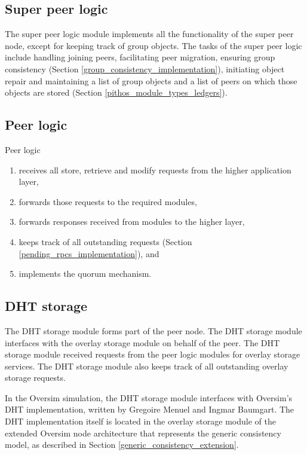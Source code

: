 \subsection{Super peer logic}
\label{pithos_module_types_sp_logic}

The super peer logic module implements all the functionality of the super peer node, except for keeping track of group objects. The tasks of the super peer logic include handling joining peers, facilitating peer migration, ensuring group consistency (Section \ref{group_consistency_implementation}), initiating object repair and maintaining a list of group objects and a list of peers on which those objects are stored (Section \ref{pithos_module_types_ledgers}).

\subsection{Peer logic}

Peer logic
\begin{enumerate}
  \item  receives all store, retrieve and modify requests from the higher application layer,
  \item forwards those requests to the required modules,
  \item forwards responses received from modules to the higher layer,
  \item keeps track of all outstanding requests (Section \ref{pending_rpcs_implementation}), and
  \item implements the quorum mechanism.
\end{enumerate}

\subsection{DHT storage}

The DHT storage module forms part of the peer node. The DHT storage module interfaces with the overlay storage module on behalf of the peer. The DHT storage module received requests from the peer logic modules for overlay storage services. The DHT storage module also keeps track of all outstanding overlay storage requests.

In the Oversim simulation, the DHT storage module interfaces with Oversim's DHT implementation, written by Gregoire Menuel and Ingmar Baumgart. The DHT implementation itself is located in the overlay storage module of the extended Oversim node architecture that represents the generic consistency model, as described in Section \ref{generic_consistency_extension}.

